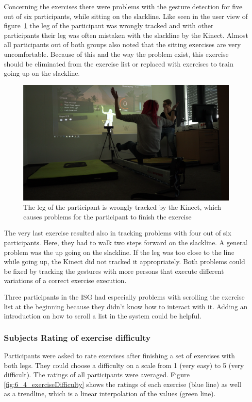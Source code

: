 Concerning the exercises there were problems with the gesture detection for five out of six participants, while sitting on the slackline.
Like seen in the user view of figure~\ref{fig:6_5_sittingProblems} the leg of the participant was wrongly tracked and with other participants their leg was often mistaken with the slackline by the Kinect.
Almost all participants out of both groups also noted that the sitting exercises are very uncomfortable.
Because of this and the way the problem exist, this exercise should be eliminated from the exercise list or replaced with exercises to train going up on the slackline.
\begin{figure}[htb]
	\centering
	\includegraphics[width=0.88\linewidth]{Pictures/6_5_sitting}
	\caption{The leg of the participant is wrongly tracked by the Kinect, which causes problems for the participant to finish the exercise}
	\label{fig:6_5_sittingProblems}
\end{figure}

The very last exercise resulted also in tracking problems with four out of six participants.
Here, they had to walk two steps forward on the slackline.
A general problem was the up going on the slackline.
If the leg was too close to the line while going up, the Kinect did not tracked it appropriately.
Both problems could be fixed by tracking the gestures with more persons that execute different variations of a correct exercise execution.

Three participants in the ISG had especially problems with scrolling the exercise list at the beginning because they didn't know how to interact with it.
Adding an introduction on how to scroll a list in the system could be helpful.

\subsubsection{Subjects Rating of exercise difficulty}
Participants were asked to rate exercises after finishing a set of exercises with both legs.
They could choose a difficulty on a scale from 1 (very easy) to 5 (very difficult).
The ratings of all participants were averaged.
Figure \ref{fig:6_4_exerciseDifficulty} shows the ratings of each exercise (blue line) as well as a trendline, which is a linear interpolation of the values (green line).

